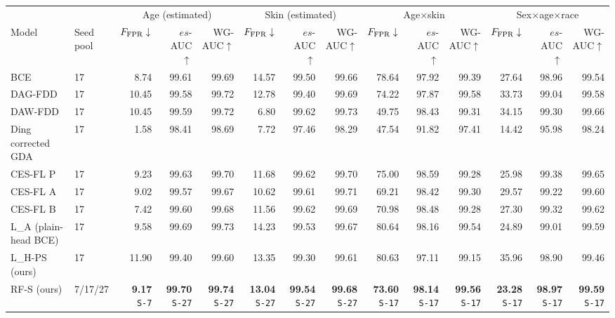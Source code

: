 \documentclass[10pt]{article}
\begin{document}
{\fontsize{7.6}{9.1}\selectfont\setlength{\tabcolsep}{3pt}
\renewcommand{\arraystretch}{1.05}
\begin{tabular*}{\linewidth}{@{\extracolsep{\fill}}llrrrrrrrrrrrr}\toprule
 & & \multicolumn{3}{c}{Age (estimated)} & \multicolumn{3}{c}{Skin (estimated)} & \multicolumn{3}{c}{Age$\times$skin} & \multicolumn{3}{c}{Sex$\times$age$\times$race}\\
Model & Seed pool & $F_{\rm FPR}\downarrow$ & $es$-AUC$\uparrow$ & WG-AUC$\uparrow$ & $F_{\rm FPR}\downarrow$ & $es$-AUC$\uparrow$ & WG-AUC$\uparrow$ & $F_{\rm FPR}\downarrow$ & $es$-AUC$\uparrow$ & WG-AUC$\uparrow$ & $F_{\rm FPR}\downarrow$ & $es$-AUC$\uparrow$ & WG-AUC$\uparrow$\\\midrule
BCE & 17 & 8.74 & 99.61 & 99.69 & 14.57 & 99.50 & 99.66 & 78.64 & 97.92 & 99.39 & 27.64 & 98.96 & 99.54\\
DAG-FDD & 17 & 10.45 & 99.58 & 99.72 & 12.78 & 99.40 & 99.69 & 74.22 & 97.87 & 99.58 & 33.73 & 99.04 & 99.58\\
DAW-FDD & 17 & 10.45 & 99.59 & 99.72 & 6.80 & 99.62 & 99.73 & 49.75 & 98.43 & 99.31 & 34.15 & 99.30 & 99.66\\
Ding corrected GDA & 17 & 1.58 & 98.41 & 98.69 & 7.72 & 97.46 & 98.29 & 47.54 & 91.82 & 97.41 & 14.42 & 95.98 & 98.24\\
CES-FL P & 17 & 9.23 & 99.63 & 99.70 & 11.68 & 99.62 & 99.70 & 75.00 & 98.59 & 99.28 & 25.98 & 99.38 & 99.65\\
CES-FL A & 17 & 9.02 & 99.57 & 99.67 & 10.62 & 99.61 & 99.71 & 69.21 & 98.42 & 99.30 & 29.57 & 99.22 & 99.60\\
CES-FL B & 17 & 7.42 & 99.60 & 99.68 & 11.56 & 99.62 & 99.69 & 70.98 & 98.48 & 99.28 & 27.30 & 99.32 & 99.62\\
L\_A (plain-head BCE) & 17 & 9.58 & 99.69 & 99.73 & 14.23 & 99.53 & 99.67 & 80.64 & 98.16 & 99.54 & 24.89 & 99.01 & 99.59\\
L\_H-PS (ours) & 17 & 11.90 & 99.40 & 99.60 & 13.35 & 99.30 & 99.61 & 80.63 & 97.11 & 99.15 & 35.96 & 98.90 & 99.46\\
RF-S (ours) & 7/17/27 & \shortstack{\textbf{9.17}\\{\tiny\texttt{S-7}}} & \shortstack{\textbf{99.70}\\{\tiny\texttt{S-27}}} & \shortstack{\textbf{99.74}\\{\tiny\texttt{S-27}}} & \shortstack{\textbf{13.04}\\{\tiny\texttt{S-27}}} & \shortstack{\textbf{99.54}\\{\tiny\texttt{S-27}}} & \shortstack{\textbf{99.68}\\{\tiny\texttt{S-27}}} & \shortstack{\textbf{73.60}\\{\tiny\texttt{S-17}}} & \shortstack{\textbf{98.14}\\{\tiny\texttt{S-17}}} & \shortstack{\textbf{99.56}\\{\tiny\texttt{S-17}}} & \shortstack{\textbf{23.28}\\{\tiny\texttt{S-17}}} & \shortstack{\textbf{98.97}\\{\tiny\texttt{S-17}}} & \shortstack{\textbf{99.59}\\{\tiny\texttt{S-17}}}\\

\end{tabular*}}
\end{document}

